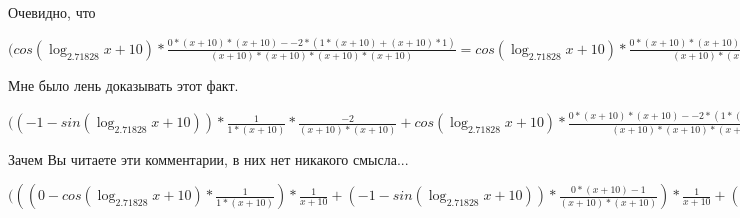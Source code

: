 \documentclass[12pt,a4paper,fleqn]{article}
\theoremstyle{definition}
\begin{document}
Очевидно, что

$(cos(\log_{ 2.71828 }{ x  +  10 }) * \frac{ 0  * ( x  +  10 ) * ( x  +  10 ) -  -2  * ( 1  * ( x  +  10 ) + ( x  +  10 ) *  1 )}{( x  +  10 ) * ( x  +  10 ) * ( x  +  10 ) * ( x  +  10 )}
 = cos(\log_{ 2.71828 }{ x  +  10 }) * \frac{ 0  * ( x  +  10 ) * ( x  +  10 ) -  -2  * ( 1  * ( x  +  10 ) + ( x  +  10 ) *  1 )}{( x  +  10 ) * ( x  +  10 ) * ( x  +  10 ) * ( x  +  10 )}
$

Мне было лень доказывать этот факт.

$(( -1  - sin(\log_{ 2.71828 }{ x  +  10 })) * \frac{ 1 }{ 1  * ( x  +  10 )}
 * \frac{ -2 }{( x  +  10 ) * ( x  +  10 )}
 + cos(\log_{ 2.71828 }{ x  +  10 }) * \frac{ 0  * ( x  +  10 ) * ( x  +  10 ) -  -2  * ( 1  * ( x  +  10 ) + ( x  +  10 ) *  1 )}{( x  +  10 ) * ( x  +  10 ) * ( x  +  10 ) * ( x  +  10 )}
 = ( -1  - sin(\log_{ 2.71828 }{ x  +  10 })) * \frac{ 1 }{ 1  * ( x  +  10 )}
 * \frac{ -2 }{( x  +  10 ) * ( x  +  10 )}
 + cos(\log_{ 2.71828 }{ x  +  10 }) * \frac{ 0  * ( x  +  10 ) * ( x  +  10 ) -  -2  * ( 1  * ( x  +  10 ) + ( x  +  10 ) *  1 )}{( x  +  10 ) * ( x  +  10 ) * ( x  +  10 ) * ( x  +  10 )}
$

Зачем Вы читаете эти комментарии, в них нет никакого смысла...

$((( 0  - cos(\log_{ 2.71828 }{ x  +  10 }) * \frac{ 1 }{ 1  * ( x  +  10 )}
) * \frac{ 1 }{ x  +  10 }
 + ( -1  - sin(\log_{ 2.71828 }{ x  +  10 })) * \frac{ 0  * ( x  +  10 ) -  1 }{( x  +  10 ) * ( x  +  10 )}
) * \frac{ 1 }{ x  +  10 }
 + ( -1  - sin(\log_{ 2.71828 }{ x  +  10 })) * \frac{ 1 }{ x  +  10 }
 * \frac{ 0  * ( x  +  10 ) -  1 }{( x  +  10 ) * ( x  +  10 )}
 + ( -1  - sin(\log_{ 2.71828 }{ x  +  10 })) * \frac{ 1 }{ 1  * ( x  +  10 )}
 * \frac{ -2 }{( x  +  10 ) * ( x  +  10 )}
 + cos(\log_{ 2.71828 }{ x  +  10 }) * \frac{ 0  * ( x  +  10 ) * ( x  +  10 ) -  -2  * ( 1  * ( x  +  10 ) + ( x  +  10 ) *  1 )}{( x  +  10 ) * ( x  +  10 ) * ( x  +  10 ) * ( x  +  10 )}
 = (( 0  - cos(\log_{ 2.71828 }{ x  +  10 }) * \frac{ 1 }{ 1  * ( x  +  10 )}
) * \frac{ 1 }{ x  +  10 }
 + ( -1  - sin(\log_{ 2.71828 }{ x  +  10 })) * \frac{ 0  * ( x  +  10 ) -  1 }{( x  +  10 ) * ( x  +  10 )}
) * \frac{ 1 }{ x  +  10 }
 + ( -1  - sin(\log_{ 2.71828 }{ x  +  10 })) * \frac{ 1 }{ x  +  10 }
 * \frac{ 0  * ( x  +  10 ) -  1 }{( x  +  10 ) * ( x  +  10 )}
 + ( -1  - sin(\log_{ 2.71828 }{ x  +  10 })) * \frac{ 1 }{ 1  * ( x  +  10 )}
 * \frac{ -2 }{( x  +  10 ) * ( x  +  10 )}
 + cos(\log_{ 2.71828 }{ x  +  10 }) * \frac{ 0  * ( x  +  10 ) * ( x  +  10 ) -  -2  * ( 1  * ( x  +  10 ) + ( x  +  10 ) *  1 )}{( x  +  10 ) * ( x  +  10 ) * ( x  +  10 ) * ( x  +  10 )}
$
\end{document}
